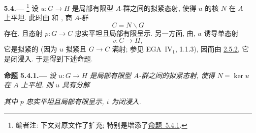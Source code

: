 
\medskip
{}\label{par:sga3-VIA-5.4}%
\noindent\textbf{5.4.---}%
\footnote{\label{note:sga3-VIA-53a}编者注: 下文对原文作了扩充;
特别是增添了\hyperref[prop:sga3-VIA-5.4.1]{命题~5.4.1}.}
设 \(u:G\to H\) 是局部有限型 \(A\)-群之间的拟紧态射,
使得 \(u\) 的核 \(N\) 在 \(A\) 上平坦.
此时由  和
, 商 \(A\)-群
\[
  C=N\backslash G
\]
存在, 且态射 \(p:G\to C\) 忠实平坦且局部有限呈示.
另一方面, 由,
\(u\) 诱导单态射
\[
  v:C\longrightarrow H,
\]
它是拟紧的 (因为 \(u\) 拟紧且 \(G\to C\) 满射;
参见 EGA~IV\(_1\), 1.1.3), 因而由 \hyperref[prop:sga3-VIA-2.5.2]{2.5.2},
它是闭浸入. 于是得到下述命题.

\medskip
{}\label{prop:sga3-VIA-5.4.1}%
\noindent\textbf{命题 5.4.1.---}
\emph{设 \(u:G\to H\) 是局部有限型 \(A\)-群之间的拟紧态射,
使得 \(N=\ker u\) 在 \(A\) 上平坦.
则 \(u\) 具有分解}
\begin{center}
  \label{diag:sga3-VIA-5.4.1-factorization}%
\end{center}
\emph{其中 \(p\) 忠实平坦且局部有限呈示, \(i\) 为闭浸入.}
\par\medskip

